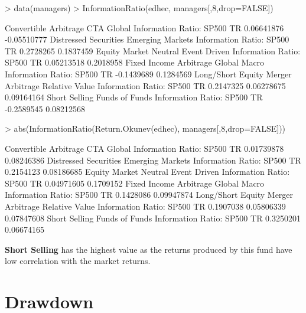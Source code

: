 \documentclass[12pt,letterpaper,english]{article}
\begin{document}
\begin{Schunk}
\begin{Sinput}
> data(managers)
> InformationRatio(edhec, managers[,8,drop=FALSE]) 
\end{Sinput}
\begin{Soutput}
                            Convertible Arbitrage  CTA Global
Information Ratio: SP500 TR            0.06641876 -0.05510777
                            Distressed Securities Emerging Markets
Information Ratio: SP500 TR             0.2728265        0.1837459
                            Equity Market Neutral Event Driven
Information Ratio: SP500 TR            0.05213518    0.2018958
                            Fixed Income Arbitrage Global Macro
Information Ratio: SP500 TR             -0.1439689    0.1284569
                            Long/Short Equity Merger Arbitrage Relative Value
Information Ratio: SP500 TR         0.2147325       0.06278675     0.09164164
                            Short Selling Funds of Funds
Information Ratio: SP500 TR    -0.2589545     0.08212568
\end{Soutput}
\begin{Sinput}
> abs(InformationRatio(Return.Okunev(edhec), managers[,8,drop=FALSE])) 
\end{Sinput}
\begin{Soutput}
                            Convertible Arbitrage CTA Global
Information Ratio: SP500 TR            0.01739878 0.08246386
                            Distressed Securities Emerging Markets
Information Ratio: SP500 TR             0.2154123       0.08186685
                            Equity Market Neutral Event Driven
Information Ratio: SP500 TR            0.04971605    0.1709152
                            Fixed Income Arbitrage Global Macro
Information Ratio: SP500 TR              0.1428086   0.09947874
                            Long/Short Equity Merger Arbitrage Relative Value
Information Ratio: SP500 TR         0.1907038       0.05806339     0.07847608
                            Short Selling Funds of Funds
Information Ratio: SP500 TR     0.3250201     0.06674165
\end{Soutput}
\end{Schunk}

\textbf{Short Selling} has the highest value as the returns produced by this fund have low correlation with the market returns.

\section{Drawdown}
\end{document}
